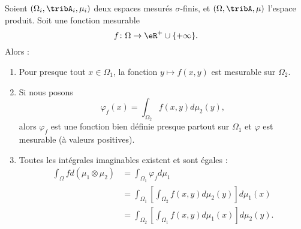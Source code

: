 \begin{theorem}\label{ThoWTMSthY}
    Soient \( (\Omega_i,\tribA_i,\mu_i)\) deux espaces mesurés \( \sigma\)-finis, et \( (\Omega,\tribA,\mu)\) l'espace produit. Soit une fonction mesurable
    \begin{equation}
        f\colon \Omega\to \eR^{+}\cup\{ +\infty \}.
    \end{equation}
    Alors :
    \begin{enumerate}
        \item
            Pour presque tout \( x\in\Omega_1\), la fonction \( y\mapsto f(x,y)\) est mesurable sur \( \Omega_2\).
        \item
            Si nous posons
            \begin{equation}
                \varphi_f(x)=\int_{\Omega_2}f(x,y)d\mu_2(y),
            \end{equation}
            alors \( \varphi_f\) est une fonction bien définie presque partout sur \( \Omega_1\) et \( \varphi\) est mesurable (à valeurs positives).
        \item
            Toutes les intégrales imaginables existent et sont égales :
            \begin{subequations}
                \begin{align}
                \int_{\Omega}fd(\mu_1\otimes \mu_2)&=\int_{\Omega_1}\varphi_fd\mu_1\\
                &=\int_{\Omega_1}\left[ \int_{\Omega_2}f(x,y)d\mu_2(y) \right]d\mu_1(x)\\
                &=\int_{\Omega_2}\left[ \int_{\Omega_1}f(x,y)d\mu_1(x) \right]d\mu_2(y).
                \end{align}
            \end{subequations}
    \end{enumerate}
\end{theorem}

